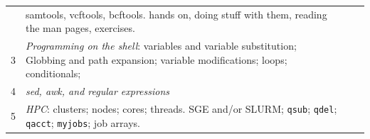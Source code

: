 \documentclass[]{krantz}
\begin{document}
\begin{longtable}[]{@{}llll@{}}
\begin{minipage}[t]{0.29\columnwidth}
\end{minipage} & \begin{minipage}[t]{0.29\columnwidth}\raggedright
samtools, vcftools, bcftools. hands on, doing stuff with them, reading the man pages, exercises.\strut
\end{minipage}\tabularnewline
\begin{minipage}[t]{0.10\columnwidth}\raggedright
3\strut
\end{minipage} & \begin{minipage}[t]{0.21\columnwidth}\raggedright
\emph{Programming on the shell}: variables and variable substitution; Globbing and path expansion; variable modifications; loops; conditionals;\strut
\end{minipage} & \begin{minipage}[t]{0.29\columnwidth}\raggedright
\strut
\end{minipage} & \begin{minipage}[t]{0.29\columnwidth}\raggedright
\strut
\end{minipage}\tabularnewline
\begin{minipage}[t]{0.10\columnwidth}\raggedright
4\strut
\end{minipage} & \begin{minipage}[t]{0.21\columnwidth}\raggedright
\emph{sed, awk, and regular expressions}\strut
\end{minipage} & \begin{minipage}[t]{0.29\columnwidth}\raggedright
\strut
\end{minipage} & \begin{minipage}[t]{0.29\columnwidth}\raggedright
\strut
\end{minipage}\tabularnewline
\begin{minipage}[t]{0.10\columnwidth}\raggedright
5\strut
\end{minipage} & \begin{minipage}[t]{0.21\columnwidth}\raggedright
\emph{HPC}: clusters; nodes; cores; threads. SGE and/or SLURM; \texttt{qsub}; \texttt{qdel}; \texttt{qacct}; \texttt{myjobs}; job arrays.\strut
\end{minipage} & \begin{minipage}[t]{0.29\columnwidth}\raggedright
\strut
\end{minipage} & \begin{minipage}[t]{0.29\columnwidth}\raggedright
\strut
\end{minipage}\tabularnewline
\bottomrule
\end{longtable}
\end{document}
